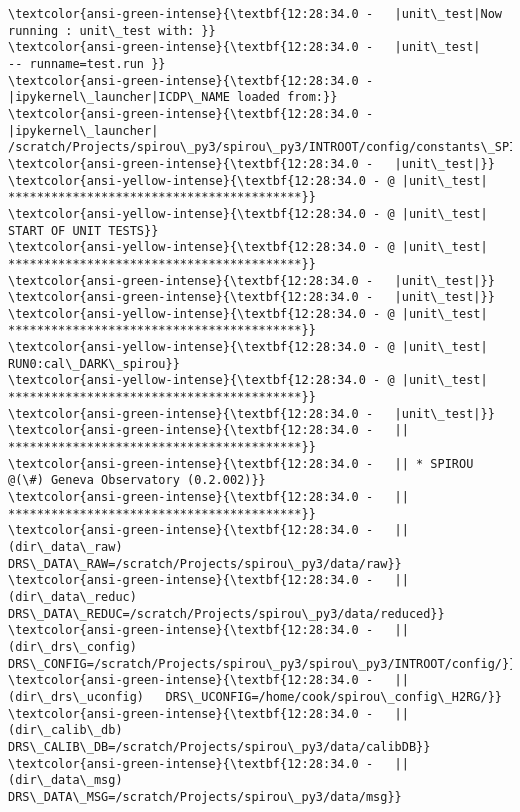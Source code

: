 \documentclass[11pt]{article}
\begin{document}
    \begin{Verbatim}[commandchars=\\\{\}]
\textcolor{ansi-green-intense}{\textbf{12:28:34.0 -   |unit\_test|Now running : unit\_test with: }}
\textcolor{ansi-green-intense}{\textbf{12:28:34.0 -   |unit\_test|       -- runname=test.run }}
\textcolor{ansi-green-intense}{\textbf{12:28:34.0 -   |ipykernel\_launcher|ICDP\_NAME loaded from:}}
\textcolor{ansi-green-intense}{\textbf{12:28:34.0 -   |ipykernel\_launcher|     /scratch/Projects/spirou\_py3/spirou\_py3/INTROOT/config/constants\_SPIROU\_H2RG.py}}
\textcolor{ansi-green-intense}{\textbf{12:28:34.0 -   |unit\_test|}}
\textcolor{ansi-yellow-intense}{\textbf{12:28:34.0 - @ |unit\_test| *****************************************}}
\textcolor{ansi-yellow-intense}{\textbf{12:28:34.0 - @ |unit\_test| START OF UNIT TESTS}}
\textcolor{ansi-yellow-intense}{\textbf{12:28:34.0 - @ |unit\_test| *****************************************}}
\textcolor{ansi-green-intense}{\textbf{12:28:34.0 -   |unit\_test|}}
\textcolor{ansi-green-intense}{\textbf{12:28:34.0 -   |unit\_test|}}
\textcolor{ansi-yellow-intense}{\textbf{12:28:34.0 - @ |unit\_test| *****************************************}}
\textcolor{ansi-yellow-intense}{\textbf{12:28:34.0 - @ |unit\_test| RUN0:cal\_DARK\_spirou}}
\textcolor{ansi-yellow-intense}{\textbf{12:28:34.0 - @ |unit\_test| *****************************************}}
\textcolor{ansi-green-intense}{\textbf{12:28:34.0 -   |unit\_test|}}
\textcolor{ansi-green-intense}{\textbf{12:28:34.0 -   || *****************************************}}
\textcolor{ansi-green-intense}{\textbf{12:28:34.0 -   || * SPIROU @(\#) Geneva Observatory (0.2.002)}}
\textcolor{ansi-green-intense}{\textbf{12:28:34.0 -   || *****************************************}}
\textcolor{ansi-green-intense}{\textbf{12:28:34.0 -   ||(dir\_data\_raw)      DRS\_DATA\_RAW=/scratch/Projects/spirou\_py3/data/raw}}
\textcolor{ansi-green-intense}{\textbf{12:28:34.0 -   ||(dir\_data\_reduc)    DRS\_DATA\_REDUC=/scratch/Projects/spirou\_py3/data/reduced}}
\textcolor{ansi-green-intense}{\textbf{12:28:34.0 -   ||(dir\_drs\_config)    DRS\_CONFIG=/scratch/Projects/spirou\_py3/spirou\_py3/INTROOT/config/}}
\textcolor{ansi-green-intense}{\textbf{12:28:34.0 -   ||(dir\_drs\_uconfig)   DRS\_UCONFIG=/home/cook/spirou\_config\_H2RG/}}
\textcolor{ansi-green-intense}{\textbf{12:28:34.0 -   ||(dir\_calib\_db)      DRS\_CALIB\_DB=/scratch/Projects/spirou\_py3/data/calibDB}}
\textcolor{ansi-green-intense}{\textbf{12:28:34.0 -   ||(dir\_data\_msg)      DRS\_DATA\_MSG=/scratch/Projects/spirou\_py3/data/msg}}

\end{Verbatim}
\end{document}
